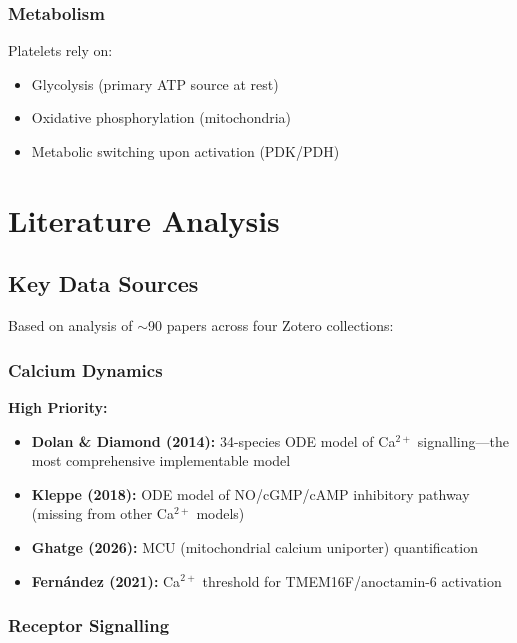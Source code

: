 \documentclass[11pt,a4paper]{report}
\begin{document}
\subsection{Metabolism}

Platelets rely on:

\begin{itemize}
    \item Glycolysis (primary ATP source at rest)
    \item Oxidative phosphorylation (mitochondria)
    \item Metabolic switching upon activation (PDK/PDH)
\end{itemize}

\chapter{Literature Analysis}

\section{Key Data Sources}

Based on analysis of $\sim$90 papers across four Zotero collections:

\subsection{Calcium Dynamics}

\textbf{High Priority:}

\begin{itemize}
    \item \textbf{Dolan \& Diamond (2014):} 34-species ODE model of Ca$^{2+}$ signalling---the most comprehensive implementable model
    \item \textbf{Kleppe (2018):} ODE model of NO/cGMP/cAMP inhibitory pathway (missing from other Ca$^{2+}$ models)
    \item \textbf{Ghatge (2026):} MCU (mitochondrial calcium uniporter) quantification
    \item \textbf{Fernández (2021):} Ca$^{2+}$ threshold for TMEM16F/anoctamin-6 activation
\end{itemize}

\subsection{Receptor Signalling}
\end{document}
